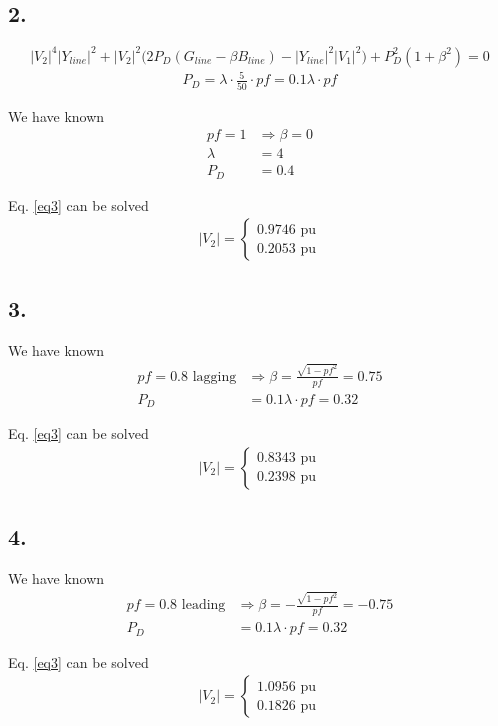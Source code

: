 \documentclass{article}
\begin{document}
\subsection*{2.}
\begin{equation}\label{eq3}
|V_2|^4 |Y_{line}|^2 + |V_2|^2 \Big(2 P_D (G_{line} - \beta B_{line}) - |Y_{line}|^2 |V_1|^2 \Big) + P_D^2 (1+\beta^2) = 0
\end{equation}
\begin{align*}
P_D = \lambda \cdot \frac{5}{50} \cdot pf = 0.1 \lambda \cdot pf
\end{align*}

We have known
\begin{align*}
pf = 1 &\Longrightarrow \beta = 0\\
\lambda &= 4\\
P_D &= 0.4
\end{align*}

Eq. \ref{eq3} can be solved
\begin{align*}
|V_2| =
\begin{cases}
0.9746 \text{ pu}\\
0.2053 \text{ pu}
\end{cases}
\end{align*}

\subsection*{3.}
We have known
\begin{align*}
pf = 0.8 \text{ lagging} &\Longrightarrow \beta = \frac{\sqrt{1 - pf^2}}{pf} = 0.75\\
P_D &= 0.1 \lambda \cdot pf = 0.32
\end{align*}

Eq. \ref{eq3} can be solved
\begin{align*}
|V_2| =
\begin{cases}
0.8343 \text{ pu}\\
0.2398 \text{ pu}
\end{cases}
\end{align*}

\subsection*{4.}
We have known
\begin{align*}
pf = 0.8 \text{ leading}&\Longrightarrow \beta = - \frac{\sqrt{1 - pf^2}}{pf} = -0.75\\
P_D &= 0.1 \lambda \cdot pf = 0.32
\end{align*}

Eq. \ref{eq3} can be solved
\begin{align*}
|V_2| =
\begin{cases}
1.0956 \text{ pu}\\
0.1826 \text{ pu}
\end{cases}
\end{align*}

\end{document}
